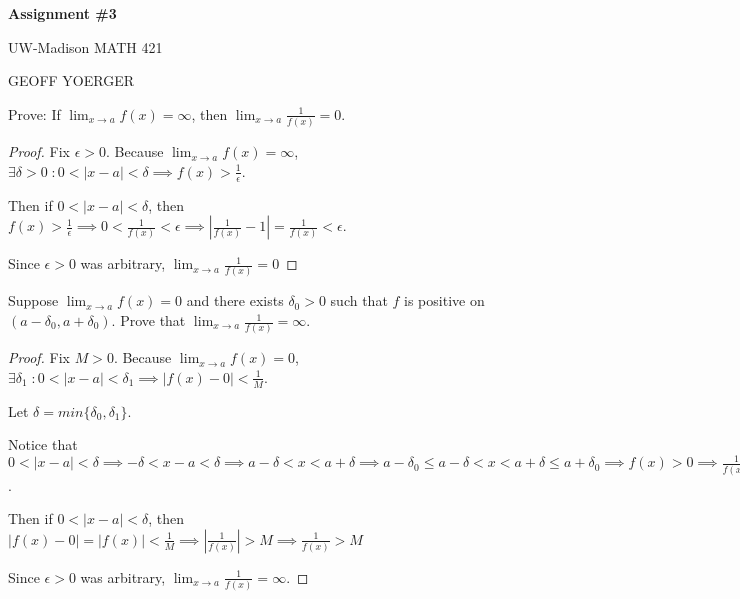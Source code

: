 \documentclass{article} %
\theoremstyle{plain}
\theoremstyle{definition}
\begin{document}
\begin{center}
    \Large{
        \textbf{Assignment \#3}

        UW-Madison MATH 421
    }
    
    \vspace{5pt}
        
    \normalsize{
        GEOFF YOERGER

        \usdate
    }
    
    \vspace{15pt}
\end{center}


\noindent{} Prove: If $\lim_{x \rightarrow a} f(x) = \infty$, then $\lim_{x \rightarrow a} \frac{1}{f(x)} = 0$. 

\begin{proof} Fix $\epsilon > 0$. Because $\lim_{x \to a} f(x) = \infty$, $\exists \delta > 0 \; \colon 0 < |x-a| < \delta \implies f(x) > \frac{1}{\epsilon}$.

    Then if $0 < |x-a| < \delta$, then $f(x) > \frac{1}{\epsilon} \implies 0 < \frac{1}{f(x)} < \epsilon \implies |\frac{1}{f(x)} - 1| = \frac{1}{f(x)} < \epsilon$.

    Since $\epsilon > 0$ was arbitrary, $\lim_{x \to a} \frac{1}{f(x)} = 0$
\end{proof}

\noindent{} Suppose $\lim_{x \rightarrow a} f(x) = 0$ and there exists $\delta_0 > 0$ such that $f$ is positive on $(a-\delta_0, a+\delta_0)$. Prove that $\lim_{x \rightarrow a} \frac{1}{f(x)} = \infty$. 

\begin{proof} Fix $M > 0$. Because $\lim_{x \to a} f(x) = 0$, $\exists \delta_1 \; \colon 0 < |x-a| < \delta_1 \implies |f(x) - 0| < \frac{1}{M}$.

    Let $\delta = min\{\delta_0, \delta_1\}$.

    Notice that $0 < |x-a| < \delta \implies - \delta < x-a < \delta \implies a - \delta < x < a + \delta \implies a - \delta_0 \leq a - \delta < x < a + \delta \leq a + \delta_0 \implies f(x) > 0 \implies \frac{1}{f(x)} > 0$.

    Then if $0 < |x-a| < \delta$, then $|f(x) - 0| = |f(x)| < \frac{1}{M} \implies |\frac{1}{f(x)}| > M \implies \frac{1}{f(x)} > M$

    Since $\epsilon > 0$ was arbitrary, $\lim_{x \rightarrow a} \frac{1}{f(x)} = \infty$. 
\end{proof}
\end{document}
